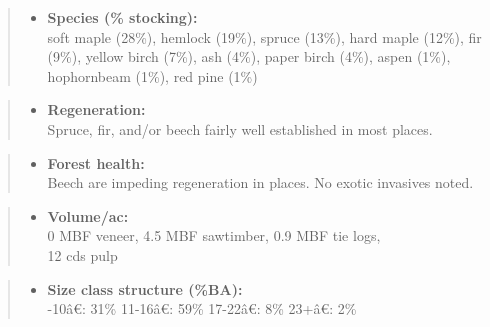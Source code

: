 \documentclass[]{tufte-handout}
\newcommand{\euro}{€}
\providecommand{\tightlist}{%
  \setlength{\itemsep}{0pt}\setlength{\parskip}{0pt}}
\begin{document}
\begin{quote}
\begin{itemize}
\tightlist
\item
  \textbf{Species (\% stocking):}\\
  \vspace{2pt} soft maple (28\%), hemlock (19\%), spruce (13\%), hard
  maple (12\%), fir (9\%), yellow birch (7\%), ash (4\%), paper birch
  (4\%), aspen (1\%), hophornbeam (1\%), red pine (1\%)
\end{itemize}
\end{quote}

\begin{quote}
\begin{itemize}
\tightlist
\item
  \textbf{Regeneration:}\\
  \vspace{2pt} Spruce, fir, and/or beech fairly well established in most
  places.
\end{itemize}
\end{quote}

\begin{quote}
\begin{itemize}
\tightlist
\item
  \textbf{Forest health:}\\
  \vspace{2pt} Beech are impeding regeneration in places. No exotic
  invasives noted.
\end{itemize}
\end{quote}

\begin{quote}
\begin{itemize}
\tightlist
\item
  \textbf{Volume/ac:}\\
  \vspace{2pt} 0 MBF veneer, 4.5 MBF sawtimber, 0.9 MBF tie logs,\\
  12 cds pulp
\end{itemize}
\end{quote}

\begin{quote}
\begin{itemize}
\tightlist
\item
  \textbf{Size class structure (\%BA):}\\
  \vspace{2pt} -10â\euro{}: 31\% \textbar{} 11-16â\euro{}:
  59\% \textbar{} 17-22â\euro{}: 8\% \textbar{} 23+â\euro{}: 2\%
\end{itemize}
\end{quote}
\end{document}
